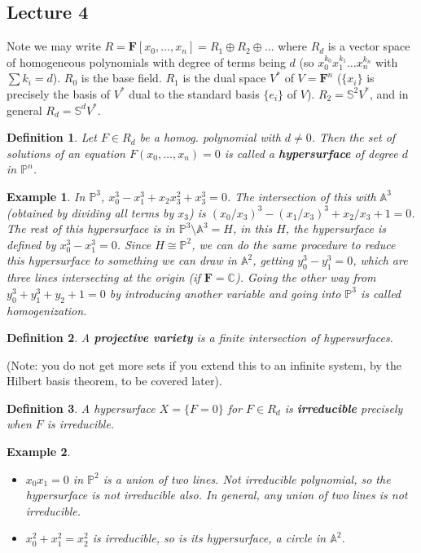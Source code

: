 \documentclass[12pt]{article}
\newcommand{\F}{\mathbf{F}}
\newcommand{\C}{\mathbb{C}}
\renewcommand{\P}{\mathbb{P}}
\newcommand{\A}{\mathbb{A}}
\newtheorem{definition}{Definition}[section]
\newtheorem*{example}{Example}
\begin{document}
    \subsection{Lecture 4}
    Note we may write $R = \F[x_0, \dots, x_n] = R_1 \oplus R_2 \oplus \dots$ where $R_d$ is a vector space of homogeneous polynomials with degree of terms being $d$ (so $x_0^{k_0}x_1^{k_1} \dots x_n^{k_n}$ with $\sum k_i = d$). $R_0$ is the base field. $R_1$ is the dual space $V^*$ of $V = \F^n$ ($\{x_i\}$ is precisely the basis of $V^*$ dual to the standard basis $\{e_i\}$ of $V$). $R_2 = \mathbb{S}^2 V^*$, and in general $R_d = \mathbb{S}^d V^*$.
    \begin{definition}
        Let $F \in R_d$ be a homog. polynomial with $d \neq 0$. Then the set of solutions of an equation $F(x_0, \dots, x_n) = 0$ is called a \textbf{hypersurface} of degree $d$ in $\P^n$.
    \end{definition}
    \begin{example}
        In $\P^3$, $x_0^3 - x_1^3 + x_2x_3^2 + x_3^3 = 0$. The intersection of this with $\A^3$ (obtained by dividing all terms by $x_3$) is $(x_0/x_3)^3 - (x_1/x_3)^3 + x_2/x_3 + 1 = 0$. The rest of this hypersurface is in $\P^3 \setminus \A^3 = H$, in this $H$, the hypersurface is defined by $x_0^3 - x_1^3 = 0$. Since $H \cong \P^2$, we can do the same procedure to reduce this hypersurface to something we can draw in $\A^2$, getting $y_0^3 - y_1^3 = 0$, which are three lines intersecting at the origin (if $\F = \C$). Going the other way from $y_0^3 + y_1^3 + y_2 + 1 = 0$ by introducing another variable and going into $\P^3$ is called \textit{homogenization}.
    \end{example}
    \begin{definition}
        A \textbf{projective variety} is a \textit{finite} intersection of hypersurfaces.
    \end{definition}
    (Note: you do not get more sets if you extend this to an infinite system, by the Hilbert basis theorem, to be covered later). \par
    \begin{definition}
        A hypersurface $X = \{F = 0\}$ for $F \in R_d$ is \textbf{irreducible} precisely when $F$ is irreducible.
    \end{definition}
    \begin{example}
        \begin{itemize}
            \item $x_0x_1 = 0$ in $\P^2$ is a union of two lines. Not irreducible polynomial, so the hypersurface is not irreducible also. In general, any union of two lines is not irreducible.
            \item $x_0^2 + x_1^2 = x_2^2$ is irreducible, so is its hypersurface, a circle in $\A^2$.
        \end{itemize}
    \end{example}
\end{document}
